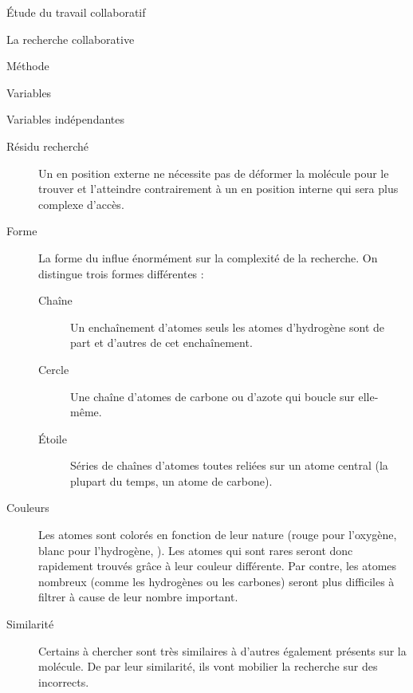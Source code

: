 \documentclass[myfrancais]{mythesis}
\begin{document}
\begin{mypart}{Étude du travail collaboratif}
\begin{mychapter}{La recherche collaborative}
\begin{mysection}{Méthode}
\begin{mysubsection}{Variables}
\begin{mysubsubsection}{Variables indépendantes}
\begin{myparagraph}{ Résidu recherché}
\begin{description}
									Un  en position externe ne nécessite pas de déformer la molécule pour le trouver et l'atteindre contrairement à un  en position interne qui sera plus complexe d'accès.
								\item[Forme] La forme du  influe énormément sur la complexité de la recherche.
									On distingue trois formes différentes :
									\begin{description}
										\item[Chaîne] Un enchaînement d'atomes seuls les atomes d'hydrogène sont de part et d'autres de cet enchaînement.
										\item[Cercle] Une chaîne d'atomes de carbone ou d'azote qui boucle sur elle-même.
										\item[Étoile] Séries de chaînes d'atomes toutes reliées sur un atome central (la plupart du temps, un atome de carbone).
									\end{description}
								\item[Couleurs] Les atomes sont colorés en fonction de leur nature (rouge pour l'oxygène, blanc pour l'hydrogène, \myetc).
									Les atomes qui sont rares seront donc rapidement trouvés grâce à leur couleur différente.
									Par contre, les atomes nombreux (comme les hydrogènes ou les carbones) seront plus difficiles à filtrer à cause de leur nombre important.
								\item[Similarité] Certains  à chercher sont très similaires à d'autres  également présents sur la molécule.
									De par leur similarité, ils vont mobilier la recherche sur des  incorrects.
							\end{description}


\end{myparagraph}
\end{mysubsubsection}
\end{mysubsection}
\end{mysection}
\end{mychapter}
\end{mypart}
\end{document}
